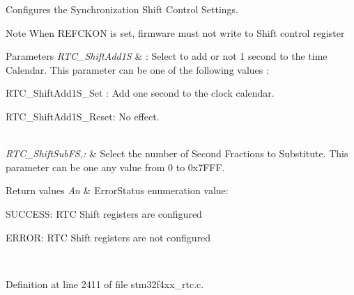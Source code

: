 Configures the Synchronization Shift Control Settings. 

\begin{DoxyNote}{Note}
When R\-E\-F\-C\-K\-O\-N is set, firmware must not write to Shift control register 
\end{DoxyNote}

\begin{DoxyParams}{Parameters}
{\em R\-T\-C\-\_\-\-Shift\-Add1\-S} & \-: Select to add or not 1 second to the time Calendar. This parameter can be one of the following values \-: \begin{DoxyItemize}
\item R\-T\-C\-\_\-\-Shift\-Add1\-S\-\_\-\-Set \-: Add one second to the clock calendar. \item R\-T\-C\-\_\-\-Shift\-Add1\-S\-\_\-\-Reset\-: No effect. \end{DoxyItemize}
\\
\hline
{\em R\-T\-C\-\_\-\-Shift\-Sub\-F\-S,\-:} & Select the number of Second Fractions to Substitute. This parameter can be one any value from 0 to 0x7\-F\-F\-F. \\
\hline
\end{DoxyParams}

\begin{DoxyRetVals}{Return values}
{\em An} & Error\-Status enumeration value\-:
\begin{DoxyItemize}
\item S\-U\-C\-C\-E\-S\-S\-: R\-T\-C Shift registers are configured
\item E\-R\-R\-O\-R\-: R\-T\-C Shift registers are not configured 
\end{DoxyItemize}\\
\hline
\end{DoxyRetVals}


Definition at line 2411 of file stm32f4xx\-\_\-rtc.\-c.


